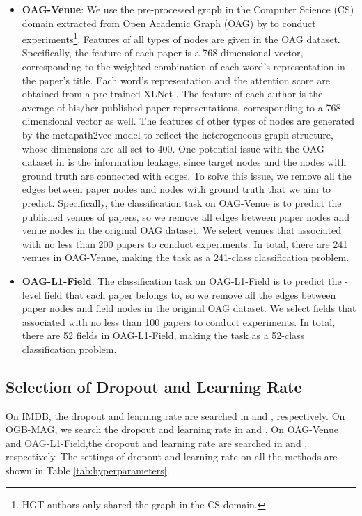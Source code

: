 \documentclass[10pt,journal,compsoc]{IEEEtran}
\newcommand{\citet}{\cite}
\newcommand{\tabref}[1]{Table \ref{#1}}
\begin{document}
\begin{itemize}
    \item \textbf{OAG-Venue}:
    We use the pre-processed graph in the Computer Science (CS) domain extracted from Open Academic Graph (OAG) by \citet{DBLP:conf/www/HuDWS20} to conduct experiments\footnote{HGT authors only shared the graph in the CS domain.}. Features of all types of nodes are given in the OAG dataset. Specifically, the feature of each paper is a 768-dimensional vector, corresponding to the weighted combination of each word's representation in the paper's title. Each word's representation and the attention score are obtained from a pre-trained XLNet \cite{DBLP:conf/nips/YangDYCSL19}. The feature of each author is the average of his/her published paper representations, corresponding to a 768-dimensional vector as well. The features of other types of nodes are generated by the metapath2vec model to reflect the heterogeneous graph structure, whose dimensions are all set to 400. One potential issue with the OAG dataset in \cite{DBLP:conf/www/HuDWS20} is the information leakage, since target nodes and the nodes with ground truth are connected with edges. To solve this issue, we remove all the edges between paper nodes and nodes with ground truth that we aim to predict. Specifically, the classification task on OAG-Venue is to predict the published venues of papers, so we remove all edges between paper nodes and venue nodes in the original OAG dataset. We select venues that associated with no less than 200 papers to conduct experiments. In total, there are 241 venues in OAG-Venue, making the task as a 241-class classification problem.
    
    \item \textbf{OAG-L1-Field}:
    The classification task on OAG-L1-Field is to predict the -level field that each paper belongs to, so we remove all the edges between paper nodes and field nodes in the original OAG dataset. We select fields that associated with no less than 100 papers to conduct experiments. In total, there are 52 fields in OAG-L1-Field, making the task as a 52-class classification problem. 
\end{itemize}


\subsection*{Selection of Dropout and Learning Rate} \label{section-appendix-hyper-parameters}
On IMDB, the dropout and learning rate are searched in  and , respectively. On OGB-MAG, we search the dropout and learning rate in  and . On OAG-Venue and OAG-L1-Field,the dropout and learning rate are searched in  and , respectively. The settings of dropout and learning rate on all the methods are shown in \tabref{tab:hyperparameters}.
\end{document}
